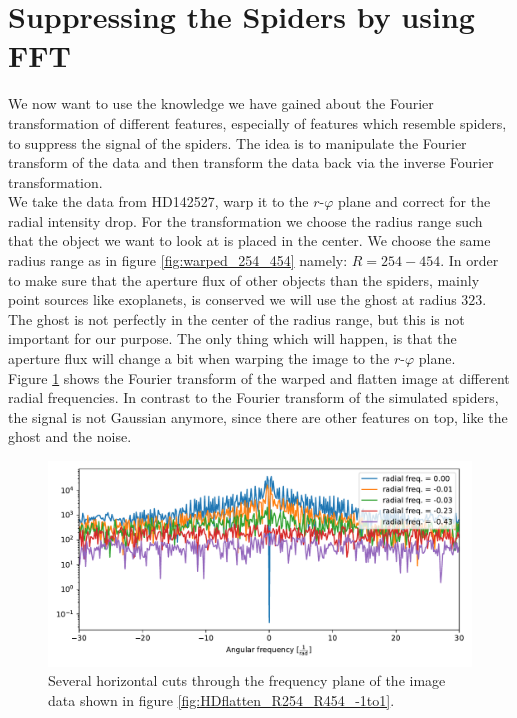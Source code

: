 \section{Suppressing the Spiders by using FFT}
We now want to use the knowledge we have gained about the Fourier transformation of different features, especially of features which resemble spiders, to suppress the signal of the spiders. The idea is to manipulate the Fourier transform of the data and then transform the data back via the inverse Fourier transformation.\\
We take the data from HD142527, warp it to the $r$-$\varphi$ plane and correct for the radial intensity drop. For the transformation we choose the radius range such that the object we want to look at is placed in the center. We choose the same radius range as in figure \ref{fig:warped_254_454} namely: $R=254-454$. In order to make sure that the aperture flux of other objects than the spiders, mainly point sources like exoplanets, is conserved we will use the ghost at radius $323$. The ghost is not perfectly in the center of the radius range, but this is not important for our purpose. The only thing which will happen, is that the aperture flux will change a bit when warping the image to the $r$-$\varphi$ plane.\\
Figure \ref{fig:rad0} shows the Fourier transform of the warped and flatten image at different radial frequencies. In contrast to the Fourier transform of the simulated spiders, the signal is not Gaussian anymore, since there are other features on top, like the ghost and the noise.
\begin{figure}[H]
	\centering
		\includegraphics[width=1.0\textwidth]{pics/rad0.pdf}
		\caption{Several horizontal cuts through the frequency plane of the image data shown in figure \ref{fig:HDflatten_R254_R454_-1to1}.}
		\label{fig:rad0}
\end{figure} 


